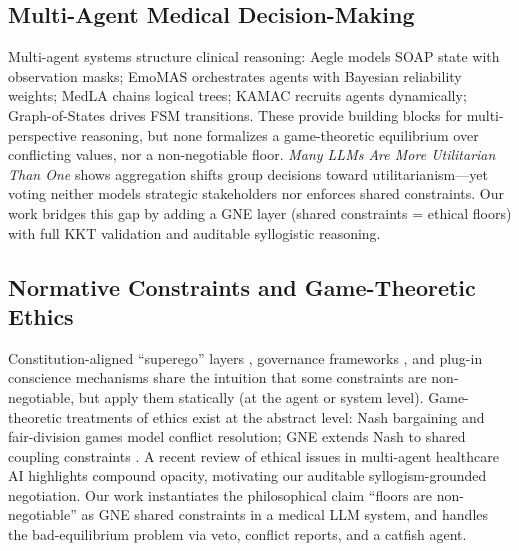 \documentclass[11pt]{article}
\begin{document}
\subsection{Multi-Agent Medical Decision-Making}
Multi-agent systems structure clinical reasoning: Aegle \cite{aegle} models
SOAP state with observation masks; EmoMAS \cite{emomas} orchestrates agents
with Bayesian reliability weights; MedLA \cite{medla} chains logical trees;
KAMAC \cite{kamac} recruits agents dynamically; Graph-of-States
\cite{graphofstates} drives FSM transitions. These provide building blocks
for multi-perspective reasoning, but none formalizes a game-theoretic
equilibrium over conflicting values, nor a non-negotiable floor.
\emph{Many LLMs Are More Utilitarian Than One} \cite{utilitarian2025} shows
aggregation shifts group decisions toward utilitarianism---yet voting neither
models strategic stakeholders nor enforces shared constraints. Our work
bridges this gap by adding a GNE layer (shared constraints = ethical floors)
with full KKT validation and auditable syllogistic reasoning.

\subsection{Normative Constraints and Game-Theoretic Ethics}
Constitution-aligned ``superego'' layers \cite{superego2025}, governance
frameworks \cite{governance2025}, and plug-in conscience mechanisms share the
intuition that some constraints are non-negotiable, but apply them
statically (at the agent or system level). Game-theoretic treatments of
ethics exist at the abstract level: Nash bargaining and fair-division games
model conflict resolution; GNE extends Nash to shared coupling constraints
\cite{facchinei2010,shared2017}. A recent review of ethical issues in
multi-agent healthcare AI \cite{frontiers2026} highlights compound opacity,
motivating our auditable syllogism-grounded negotiation. Our work instantiates
the philosophical claim ``floors are non-negotiable'' as GNE shared
constraints in a medical LLM system, and handles the bad-equilibrium problem
via veto, conflict reports, and a catfish agent.

\end{document}
